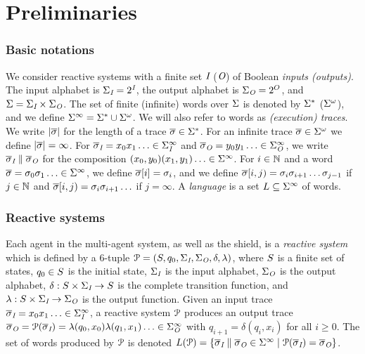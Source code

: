 \section{Preliminaries}
\label{sec_prel}

\subsubsection{Basic notations}
We consider reactive systems with a finite set
$\textit{I}$ ($\textit{O}$) of Boolean \emph{inputs (outputs)}.
The input alphabet is
$\Sigma_{\textit{I}}=2^{\textit{I}}$, the output alphabet is $\Sigma_{\textit{O}}=2^O$, and
$\Sigma=\Sigma_{\textit{I}} \times \Sigma_{\textit{O}}$. The set of finite (infinite) words
over $\Sigma$ is denoted by $\Sigma^*$ ($\Sigma^\omega$), and
we define $\Sigma^{\infty} = \Sigma^* \cup \Sigma^\omega$.  We will also refer
to words as \emph{(execution) traces}.  We write $|\overline\sigma|$ for the
length of a trace $\overline\sigma\in \Sigma^*$. For an infinite trace $\overline\sigma\in \Sigma^\omega$ we define $|\overline\sigma| =\infty$. For $\overline\sigma_{\textit{I}} = x_0
x_1 \ldots \in \Sigma_{\textit{I}}^\infty$ and $\overline\sigma_{\textit{O}} = y_0 y_1 \ldots \in
\Sigma_{\textit{O}}^\infty$, we write $\overline\sigma_{\textit{I}} \parallel \overline\sigma_{\textit{O}}$ for the
composition $(x_0,y_0) (x_1,y_1) \ldots \in \Sigma^\infty$.
For $i \in \mathbb{N}$ and a word $\overline\sigma = \sigma_0\sigma_1\ldots \in \Sigma^\infty$, we define $\overline\sigma[i] = \sigma_i$, and we define $\overline\sigma[i,j) = \sigma_i\sigma_{i+1}\ldots\sigma_{j-1}$ if $j \in \mathbb{N}$ and $\overline\sigma[i,j) = \sigma_i\sigma_{i+1}\ldots$ if $j = \infty$.
A \emph{language} is a set $L
\subseteq  \Sigma^\infty$ of words.


\subsubsection{Reactive systems}

Each agent in the multi-agent system, as well as the shield, is a \emph{reactive system} which is defined by a
6-tuple $\mathcal{P} = (S,q_{0},\Sigma_{\textit{I}},\Sigma_{\textit{O}},\delta,\lambda)$,
where
$S$ is a finite set of states,
$q_{0} \in S$ is the initial state,
$\Sigma_{\textit{I}}$ is the input alphabet,
$\Sigma_{\textit{O}}$ is the output alphabet,
$\delta: S \times \Sigma_{\textit{I}} \to S$ is the complete transition function, and $\lambda : S \times \Sigma_{\textit{I}} \to \Sigma_{\textit{O}}$ is the output function.
%
Given an input trace $\overline\sigma_{\textit{I}} = x_0 x_1 \ldots \in \Sigma_{\textit{I}}^\infty$, a reactive system $\mathcal{\mathcal{P}}$ produces an
output trace $\overline\sigma_{\textit{O}} = \mathcal{\mathcal{P}}(\overline\sigma_{\textit{I}}) = \lambda(q_0, x_0)
\lambda(q_1, x_1) \ldots \in \Sigma_{\textit{O}}^\infty$ with $q_{i+1} = \delta(q_i, x_i)$ for all $i \ge 0$.
The set of words produced by
$\mathcal{\mathcal{P}}$ is denoted $L(\mathcal{\mathcal{P}}) = \{\overline\sigma_{\textit{I}} \parallel \overline\sigma_{\textit{O}} \in
\Sigma^\infty \mid \mathcal{\mathcal{P}}(\overline\sigma_{\textit{I}}) = \overline\sigma_{\textit{O}}\}$.

